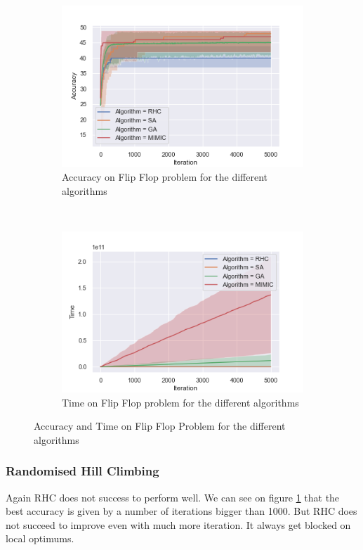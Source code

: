 \documentclass[twocolumn, 10pt]{article}
\begin{document}
				\begin{figure}[h]
					\centering
					\begin{subfigure}[t]{\columnwidth}
						\centering
						\includegraphics[width=0.68\linewidth]{../graphics/flip_flop_all_Iteration_Error_Algorithm.png}
						\caption{Accuracy on Flip Flop problem for the different algorithms}
						\label{ff:all_accuracy}
					\end{subfigure}
					~
					\begin{subfigure}[t]{\columnwidth}
						\centering
						\includegraphics[width=0.68\linewidth]{../graphics/flip_flop_all_Iteration_Time_Algorithm.png}
						\caption{Time on Flip Flop problem for the different algorithms}
						\label{ff:all_time}
					\end{subfigure}
					\caption{Accuracy and Time on Flip Flop Problem for the different algorithms}
					\label{ff:all}
				\end{figure}
			\subsubsection*{Randomised Hill Climbing}
				Again RHC does not success to perform well. We can see on figure \ref{ff:all_accuracy} that the best accuracy is given by a number of iterations bigger than 1000. But RHC does not succeed to improve even with much more iteration. It always get blocked on local optimums.
\end{document}
